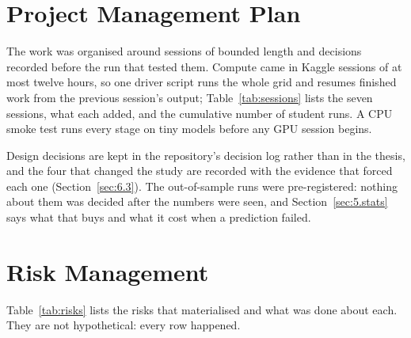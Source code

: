 \section{Project Management Plan}
\label{sec:pm}
The work was organised around sessions of bounded length and decisions recorded before the run that
tested them. Compute came in Kaggle sessions of at most twelve hours, so one driver script runs the
whole grid and resumes finished work from the previous session's output; Table~\ref{tab:sessions}
lists the seven sessions, what each added, and the cumulative number of student runs. A CPU smoke test
runs every stage on tiny models before any GPU session begins.

Design decisions are kept in the repository's decision log rather than in the thesis, and the four
that changed the study are recorded with the evidence that forced each one (Section~\ref{sec:6.3}).
The out-of-sample runs were pre-registered: nothing about them was decided after the numbers were
seen, and Section~\ref{sec:5.stats} says what that buys and what it cost when a prediction failed.

\section{Risk Management}
\label{sec:risk}
Table~\ref{tab:risks} lists the risks that materialised and what was done about each. They are not
hypothetical: every row happened.

